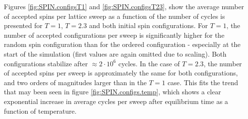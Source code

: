 \documentclass[%
oneside,                 %
final,                   %
10pt]{article}
\begin{document}
Figures \ref{fig:SPIN.configsT1} and \ref{fig:SPIN.configsT23}, show the average number of accepted spins per lattice sweep as a function of the number of cycles is presented for $T=1$, $T=2.3$ and both initial spin configurations. For $T=1$, the number of accepted configurations per sweep is significantly higher for the random spin configuration than for the ordered configuration - especially at the start of the simulation (first values are again omitted due to scaling). Both configurations stabilize after $\approx 2 \cdot 10^6$ cycles. In the case of $T=2.3$, the number of accepted spins per sweep is approximately the same for both configurations, and two orders of magnitudes larger than in the $T=1$ case. This fits the trend that may been seen in figure \ref{fig:SPIN.configs.temp}, which shows a clear exponential increase in average cycles per sweep after equilibrium time as a function of temperature.
\end{document}
